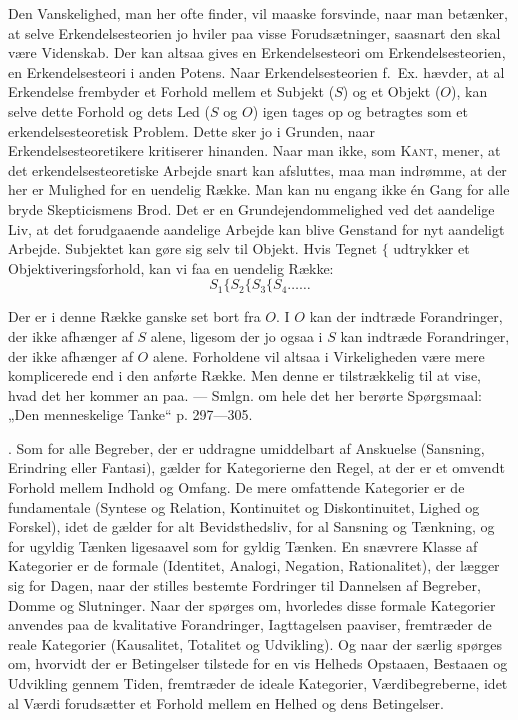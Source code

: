 \documentclass[12pt]{article}
\newcommand{\opage}[1]{\marginnote{\footnotesize\textit{[#1]}}}
\begin{document}
Den Vanskelighed, man her ofte finder, vil maaske forsvinde, naar man betænker,
at selve Erkendelsesteorien jo hviler paa visse Forudsætninger, saasnart den
skal være Videnskab. Der kan altsaa gives en Erkendelsesteori om
Erkendelsesteorien, en Erkendelsesteori i anden Potens. Naar
Erkendelsesteorien f.~Ex. hævder, at al Erkendelse frembyder et Forhold mellem
et Subjekt ($S$) og et Objekt ($O$), kan selve dette Forhold og dets Led ($S$ og
$O$) igen tages op og betragtes som et erkendelsesteoretisk Problem. Dette sker
jo i Grunden, naar Erkendelsesteoretikere kritiserer hinanden. Naar man ikke,
som \textsc{Kant}, mener, at det erkendelsesteoretiske Arbejde snart kan
afsluttes, maa man indrømme, at der her er Mulighed for en uendelig Række. Man
kan nu engang ikke én Gang for alle bryde Skepticismens Brod. Det er en
Grundejendommelighed ved det aandelige Liv, at det forudgaaende aandelige Arbejde
kan blive Genstand for nyt aandeligt Arbejde. Subjektet kan gøre sig selv til
Objekt. Hvis Tegnet $\lbrace$ udtrykker et Objektiveringsforhold, kan vi faa en
uendelig Række:
\[ S_1 \lbrace S_2 \lbrace S_3 \lbrace S_4 \ldots\ldots \]

Der er i denne Række ganske set bort fra $O$. I $O$ kan der indtræde
Forandringer, der ikke afhænger af $S$ alene, ligesom der jo ogsaa i $S$ kan
indtræde Forandringer, der ikke afhænger af $O$ alene. Forholdene vil altsaa i
Virkeligheden være mere komplicerede end i den anførte Række. Men denne er
tilstrækkelig til at vise, hvad det her kommer an paa. --- Smlgn. om hele det
her berørte Spørgsmaal: „Den menneskelige Tanke“ p. 297---305.

. Som for alle Begreber, der er uddragne umiddelbart af Anskuelse (Sansning,
Erindring eller Fantasi), gælder for Kategorierne den Regel, at der er et
omvendt Forhold mellem Indhold og Omfang. De mere omfattende Kategorier er de
fundamentale (Syntese og Relation, Kontinuitet og Diskontinuitet, Lighed og
Forskel), idet de gælder for alt Bevidsthedsliv, for al Sansning og Tænkning, og
for ugyldig Tænken ligesaavel som for gyldig Tænken. En snævrere Klasse af
Kategorier er de formale (Identitet, Analogi, Negation, Rationalitet), der
lægger sig for Dagen, naar der stilles bestemte Fordringer til Dannelsen af
Begreber, Domme og Slutninger. Naar der spørges om, hvorledes disse formale
Kategorier anvendes paa de kvalitative Forandringer, Iagttagelsen paaviser,
fremtræder de reale Kategorier
\opage{19}(Kausalitet, Totalitet og Udvikling). Og naar der særlig spørges om, hvorvidt der
er Betingelser tilstede for en vis Helheds Opstaaen, Bestaaen og Udvikling gennem
Tiden, fremtræder de ideale Kategorier, Værdibegreberne, idet al Værdi forudsætter
et Forhold mellem en Helhed og dens Betingelser.
\end{document}
